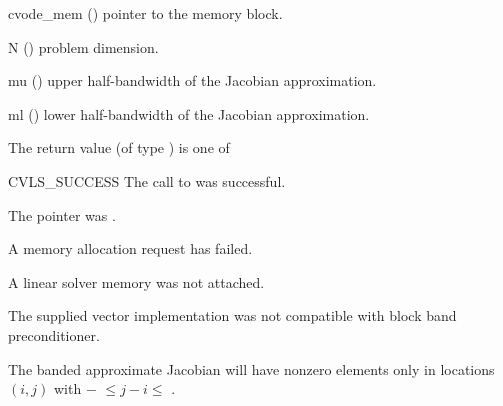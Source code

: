 {
  \begin{args}
  \item[cvode\_mem] ()
    pointer to the {\cvode} memory block.
  \item[N] ()
    problem dimension.
  \item[mu] ()
    upper half-bandwidth of the Jacobian approximation.
  \item[ml] ()
    lower half-bandwidth of the Jacobian approximation.
  \end{args}
}
{
  The return value  (of type ) is one of
  \begin{args}
  \item[CVLS\_SUCCESS]
    The call to  was successful.
  \item[\id{CVLS\_MEM\_NULL}]
    The  pointer was .
  \item[\Id{CVLS\_MEM\_FAIL}]
    A memory allocation request has failed.
  \item[\Id{CVLS\_LMEM\_NULL}]
    A {\cvls} linear solver memory was not attached.
  \item[\Id{CVLS\_ILL\_INPUT}]
    The supplied vector implementation was not compatible with block
    band preconditioner.
  \end{args}
}
{
  The banded approximate Jacobian will have nonzero elements only in locations
  $(i,j)$ with $-$ $\leq j-i \leq$ .
}

